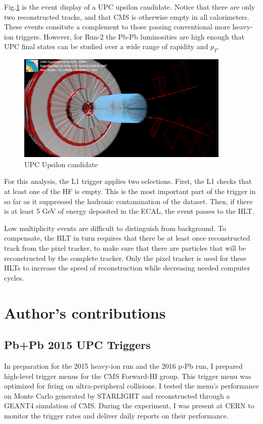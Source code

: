 Fig.\ref{fig:eventdisplayUPCUps} is the event display of a UPC upsilon candidate. Notice that there are only two reconstructed tracks, and that CMS is otherwise empty in all calorimeters. These events consitute a complement to those passing conventional more heavy-ion triggers. However, for Run-2 the Pb-Pb luminosities are high enough that UPC final states can be studied over a wide range of rapidity and $p_T$.

\begin{figure}[h!]
\begin{centering}
\includegraphics[width=4in]{Chapter3/importfigs/upcJpsi_run285530_lumi594_event944509077_v0.png}
\par\end{centering}
\caption{UPC Upsilon candidate \label{fig:eventdisplayUPCUps}}
\end{figure}

For this analysis, the L1 trigger applies two selections. First, the L1 checks that at least one of the HF is empty. This is the most important part of the trigger in so far as it suppressed the hadronic contamination of the dataset. Then, if there is at least 5 GeV of energy deposited in the ECAL, the event passes to the HLT. 

Low multiplicity events are difficult to distinguish from background. To compensate, the HLT in turn requires that there be at least once reconstructed track from the pixel tracker, to make sure that there are particles that will be reconstructed by the complete tracker. Only the pixel tracker is used for these HLTs to increase the speed of reconstruction while decreasing needed computer cycles. 

\section{Author's contributions}

\subsection{Pb+Pb 2015 UPC Triggers}
In preparation for the 2015 heavy-ion run and the 2016 p-Pb run, I prepared high-level trigger menus for the CMS Forward-HI group. This trigger menu was optimized for firing on ultra-peripheral collisions. I tested the menu's performance on Monte Carlo generated by STARLIGHT and reconstructed through a GEANT4 simulation of CMS. During the experiment, I was present at CERN to monitor the trigger rates and deliver daily reports on their performance. 

